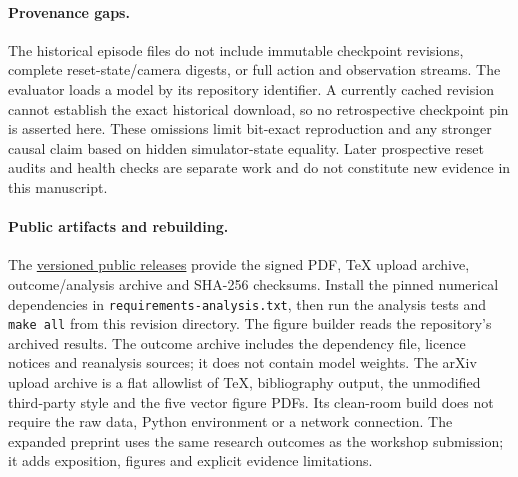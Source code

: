 \documentclass{article}
\begin{document}
\paragraph{Provenance gaps.}
The historical episode files do not include immutable checkpoint revisions,
complete reset-state/camera digests, or full action and observation streams.
The evaluator loads a model by its repository identifier. A currently cached
revision cannot establish the exact historical download, so no retrospective
checkpoint pin is asserted here. These omissions limit bit-exact reproduction
and any stronger causal claim based on hidden simulator-state equality.
Later prospective reset audits and health checks are separate work and do not
constitute new evidence in this manuscript.

\paragraph{Public artifacts and rebuilding.}
The \href{https://github.com/noteflowai/vla-regressions/releases}{versioned public releases}
provide the signed PDF, TeX upload archive, outcome/analysis archive and SHA-256
checksums. Install the pinned numerical dependencies in
\texttt{requirements-analysis.txt}, then run the analysis tests and
\texttt{make all} from this revision directory. The figure builder reads the
repository's archived results. The outcome archive includes the dependency file,
licence notices and reanalysis sources; it does not contain model weights.
The arXiv upload archive is a flat allowlist of TeX, bibliography output, the
unmodified third-party style and the five vector figure PDFs. Its clean-room
build does not require the raw data, Python environment or a network connection.
The expanded preprint uses the same research outcomes as the workshop submission;
it adds exposition, figures and explicit evidence limitations.
\end{document}
